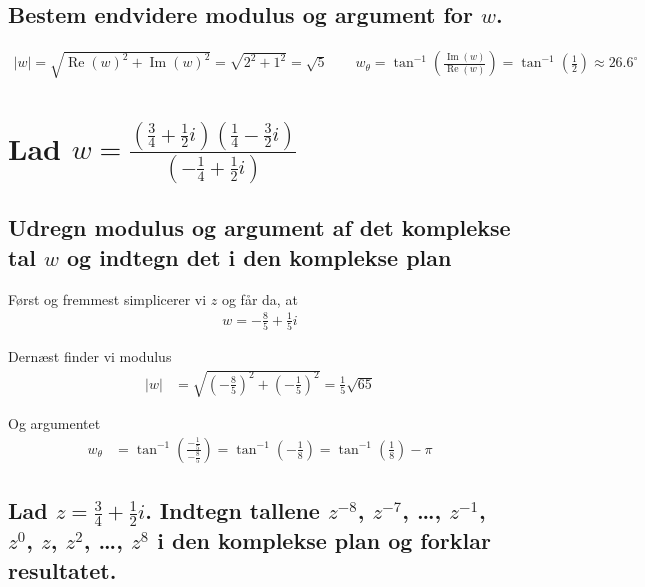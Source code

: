 \documentclass[11pt,a4paper]{article}
\newcommand{\modulus}[1]{\lvert#1\rvert}
\newcommand{\degree}{^{\circ}}
\DeclareMathOperator{\re}{Re}
\DeclareMathOperator{\im}{Im}
\begin{document}
\subsection{\mdseries
    Bestem endvidere modulus og argument for $w$.
}
\begin{align*}
    \modulus{w} = \sqrt{\re(w)^2 + \im(w)^2}
                = \sqrt{2^2 + 1^2}
                = \sqrt{5}
    \qquad
    w_\theta = \tan^{-1}\left(\frac{\im(w)}{\re(w)}\right)
             = \tan^{-1}\left(\frac{1}{2}\right)
             \approx 26.6\degree
\end{align*}

\section{\mdseries
    Lad $w = \frac
        {
        \left(
            \frac{3}{4} + \frac{1}{2}i
        \right)
        \left(
             \frac{1}{4} - \frac{3}{2}i
        \right)
        }
        {
        \left(
            -\frac{1}{4} + \frac{1}{2}i
        \right)
        }$
}

\subsection{\mdseries Udregn modulus og argument af det komplekse tal $w$ og
    indtegn det i den komplekse plan}
Først og fremmest simplicerer vi $z$ og får da, at
\begin{align*}
    w = -\frac{8}{5} + \frac{1}{5}i
\end{align*}

Dernæst finder vi modulus
\begin{align*}
    \modulus{w} &=
    \sqrt{
        \left(-\frac{8}{5}\right)^2 +
        \left(-\frac{1}{5}\right)^2}
    = \frac{1}{5}\sqrt{65}
\end{align*}

Og argumentet
\begin{align*}
    w_\theta &= \tan^{-1}\left( \frac{ -\frac{1}{5} }{ -\frac{8}{5} } \right)
              = \tan^{-1}\left( -\frac{1}{8} \right)
              = \tan^{-1}\left( \frac{1}{8} \right) - \pi
\end{align*}

\subsection{\mdseries Lad $z = \frac{3}{4} + \frac{1}{2}i$. Indtegn tallene
$z^{-8}$, $z^{-7}$, \dots, $z^{-1}$, $z^0$, $z$, $z^2$, \dots, $z^8$ i den
komplekse plan og forklar resultatet.}
\end{document}
